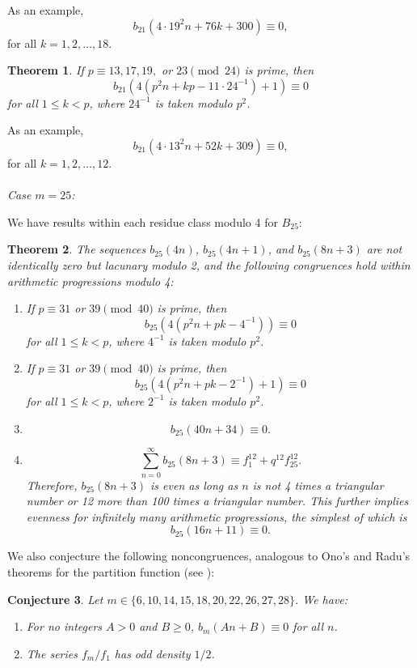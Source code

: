 \documentclass[12pt]{amsart}
\newtheorem{theorem}{Theorem}%
\newtheorem{conjecture}[theorem]{Conjecture}
\theoremstyle{definition}
\begin{document}
As an example, $$b_{21}(4\cdot19^2n + 76k+300) \equiv 0,$$ for all $k=1,2, \dots,18$.
\begin{theorem}\label{21in41} If $p \equiv 13, 17, 19,$ or $23 \pmod{24}$ is prime, then $$b_{21}(4(p^2n+kp-11 \cdot 24^{-1})+1) \equiv 0 $$ for all $1 \leq k < p$, where $24^{-1}$ is taken modulo $p^2$.
\end{theorem}

As an example, $$b_{21}(4 \cdot 13^2 n + 52k + 309) \equiv 0,$$ for all $k=1,2, \dots,12$.\\
\\
\noindent \emph{Case $m = 25$:}

We have results within each residue class modulo 4 for $B_{25}$: 
\begin{theorem}\label{b25thm} The sequences $b_{25}(4n)$, $b_{25}(4n+1)$, and $b_{25}(8n+3)$ are not identically zero but lacunary modulo 2, and the following congruences hold within arithmetic progressions modulo 4: \begin{enumerate}
\item If $p \equiv 31$ or $39 \pmod{40}$ is prime, then $$b_{25}(4(p^2n + p k - 4^{-1})) \equiv 0 $$ for all $1 \leq k < p$, where $4^{-1}$ is taken modulo $p^2$.  
\item If $p \equiv 31$ or $39 \pmod{40}$ is prime, then $$b_{25}(4(p^2n+pk - 2^{-1}) + 1) \equiv 0 $$ for all $1 \leq k < p$, where $2^{-1}$ is taken modulo $p^2$.
\item $$b_{25}(40n+34) \equiv 0 .$$
\item $$\sum_{n=0}^\infty b_{25}(8n+3) \equiv f_1^{12} + q^{12} f_{25}^{12}.$$
Therefore, $b_{25}(8n+3)$ is even as long as $n$ is not 4 times a triangular number or 12 more than 100 times a triangular number. This further implies evenness for infinitely many arithmetic progressions, the simplest of which is $$b_{25}(16n+11) \equiv 0 .$$
\end{enumerate}
\end{theorem}

We also conjecture the following noncongruences, analogous to Ono's and Radu's theorems for the partition function (see \cite{Ono2,Radu}):
\begin{conjecture}\label{noncong} Let $m \in \{ 6, 10, 14, 15, 18, 20, 22, 26, 27, 28\}$. We have: 
\begin{enumerate}
\item For no integers $A>0$ and $ B \ge 0$, $b_m(An+B) \equiv 0 $ for all $n$.
\item The series $f_m / f_1$ has odd density $1/2$.
\end{enumerate}
\end{conjecture}
\end{document}
